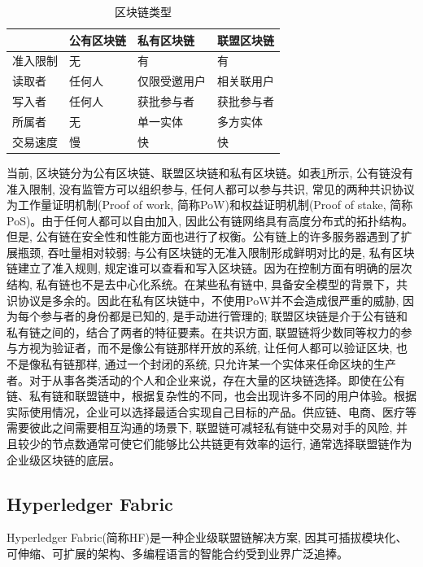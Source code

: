 {\footnotesize
\begin{longtable}[h]{m{70pt} m{70pt} m{70pt} m{70pt}}
    \caption[区块链类型]{区块链类型} \label{blockchain_type} \\
        \toprule   
        &\textbf{公有区块链}&\textbf{私有区块链}&\textbf{联盟区块链}\\
        \hline
        准入限制&无&有&有\\
        
        读取者&任何人&仅限受邀用户&相关联用户\\
        
        写入者&任何人&获批参与者&获批参与者\\
        
        所属者&无&单一实体&多方实体\\
        
        交易速度&慢&快&快\\
        \bottomrule
    \end{longtable}
}

当前, 区块链分为公有区块链、联盟区块链和私有区块链。如表\ref{blockchain_type}所示, 公有链没有准入限制, 没有监管方可以组织参与, 任何人都可以参与共识, 常见的两种共识协议为工作量证明机制(Proof of work, 简称PoW)和权益证明机制(Proof of stake, 简称PoS)。由于任何人都可以自由加入, 因此公有链网络具有高度分布式的拓扑结构。但是, 公有链在安全性和性能方面也进行了权衡。公有链上的许多服务器遇到了扩展瓶颈, 吞吐量相对较弱; 与公有区块链的无准入限制形成鲜明对比的是, 私有区块链建立了准入规则, 规定谁可以查看和写入区块链。因为在控制方面有明确的层次结构, 私有链也不是去中心化系统。在某些私有链中, 具备安全模型的背景下，共识协议是多余的。因此在私有区块链中，不使用PoW并不会造成很严重的威胁, 因为每个参与者的身份都是已知的, 是手动进行管理的; 联盟区块链是介于公有链和私有链之间的，结合了两者的特征要素。在共识方面, 联盟链将少数同等权力的参与方视为验证者，而不是像公有链那样开放的系统, 让任何人都可以验证区块, 也不是像私有链那样, 通过一个封闭的系统, 只允许某一个实体来任命区块的生产者。对于从事各类活动的个人和企业来说，存在大量的区块链选择。即使在公有链、私有链和联盟链中，根据复杂性的不同，也会出现许多不同的用户体验。根据实际使用情况，企业可以选择最适合实现自己目标的产品。供应链、电商、医疗等需要彼此之间需要相互沟通的场景下, 联盟链可减轻私有链中交易对手的风险, 并且较少的节点数通常可使它们能够比公共链更有效率的运行, 通常选择联盟链作为企业级区块链的底层。

\subsection{Hyperledger Fabric}
Hyperledger Fabric\footnotemark[1](简称HF)是一种企业级联盟链解决方案, 因其可插拔模块化、可伸缩、可扩展的架构、多编程语言的智能合约受到业界广泛追捧。

